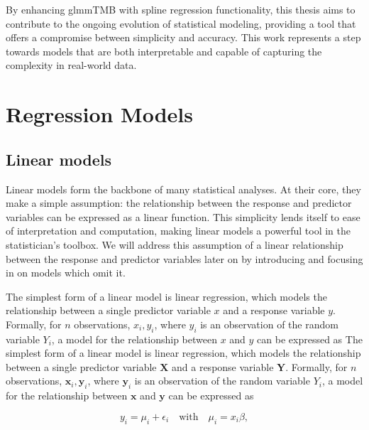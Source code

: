 \documentclass[12pt, twoside,hidelinks]{article}
\theoremstyle{definition}
\numberwithin{equation}{section}
\begin{document}
By enhancing glmmTMB with spline regression functionality, this thesis aims to contribute to the ongoing evolution of statistical modeling, providing a tool that offers a compromise between simplicity and accuracy. This work represents a step towards models that are both interpretable and capable of capturing the complexity in real-world data.


	
\newpage



\newpage

\section{Regression Models}

\subsection{Linear models}

Linear models form the backbone of many statistical analyses. At their core, they make a simple assumption: the relationship between the response and predictor variables can be expressed as a linear function. This simplicity lends itself to ease of interpretation and computation, making linear models a powerful tool in the statistician's toolbox. We will address this assumption of a linear relationship between the response and predictor variables later on by introducing and focusing in on models which omit it. 

The simplest form of a linear model is linear regression, which models the relationship between a single predictor variable \(x\) and a response variable \(y\). Formally, for $n$ observations, $x_i, y_i$, where $y_i$ is an observation of the random variable $Y_i$, a model for the relationship between $x$ and $y$ can be expressed as
The simplest form of a linear model is linear regression, which models the relationship between a single predictor variable \(\mathbf{X}\) and a response variable \(\mathbf{Y}\). Formally, for \( n \) observations, \(\mathbf{x}_i, \mathbf{y}_i\), where \(\mathbf{y}_i\) is an observation of the random variable \(Y_i\), a model for the relationship between \(\mathbf{x}\) and \(\mathbf{y}\) can be expressed as

\begin{equation}
    y_i = \mu_i + \epsilon_i \quad \text{with} \quad \mu_i = x_i\beta, 
    \label{eq:lm_general_form}
\end{equation}
\end{document}
